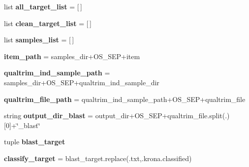 \begin{DoxyCompactItemize}
\item 
list {\bfseries all\+\_\+target\+\_\+list} = \mbox{[}$\,$\mbox{]}\hypertarget{namespaceNGSXclassify_af294c502a5a0fcd149b02d510c337305}{}\label{namespaceNGSXclassify_af294c502a5a0fcd149b02d510c337305}

\item 
list {\bfseries clean\+\_\+target\+\_\+list} = \mbox{[}$\,$\mbox{]}\hypertarget{namespaceNGSXclassify_afb1fd226c54f1212df6365dfa1741d85}{}\label{namespaceNGSXclassify_afb1fd226c54f1212df6365dfa1741d85}

\item 
list {\bfseries samples\+\_\+list} = \mbox{[}$\,$\mbox{]}\hypertarget{namespaceNGSXclassify_a45d4e8028236377e967553e401929a96}{}\label{namespaceNGSXclassify_a45d4e8028236377e967553e401929a96}

\item 
{\bfseries item\+\_\+path} = samples\+\_\+dir+O\+S\+\_\+\+S\+EP+item\hypertarget{namespaceNGSXclassify_a4d87c8a203f9736a3302d6ab28fecd44}{}\label{namespaceNGSXclassify_a4d87c8a203f9736a3302d6ab28fecd44}

\item 
{\bfseries qualtrim\+\_\+ind\+\_\+sample\+\_\+path} = samples\+\_\+dir+O\+S\+\_\+\+S\+EP+qualtrim\+\_\+ind\+\_\+sample\+\_\+dir\hypertarget{namespaceNGSXclassify_a314658da300d776f245e66b1305e3fe1}{}\label{namespaceNGSXclassify_a314658da300d776f245e66b1305e3fe1}

\item 
{\bfseries qualtrim\+\_\+file\+\_\+path} = qualtrim\+\_\+ind\+\_\+sample\+\_\+path+O\+S\+\_\+\+S\+EP+qualtrim\+\_\+file\hypertarget{namespaceNGSXclassify_afc7a77aab3eb745c2ac232544ee16591}{}\label{namespaceNGSXclassify_afc7a77aab3eb745c2ac232544ee16591}

\item 
string {\bfseries output\+\_\+dir\+\_\+blast} = output\+\_\+dir+O\+S\+\_\+\+S\+EP+qualtrim\+\_\+file.\+split(\textquotesingle{}.\textquotesingle{})\mbox{[}0\mbox{]}+\char`\"{}\+\_\+blast\char`\"{}\hypertarget{namespaceNGSXclassify_ae96ee9a5d6d203a0ccbdff8371de8025}{}\label{namespaceNGSXclassify_ae96ee9a5d6d203a0ccbdff8371de8025}

\item 
tuple {\bfseries blast\+\_\+target}
\item 
{\bfseries classify\+\_\+target} = blast\+\_\+target.\+replace(\textquotesingle{}.txt\textquotesingle{},\textquotesingle{}.krona.\+classified\textquotesingle{})\hypertarget{namespaceNGSXclassify_aa44e81f1b4732a8afae3b0cc0d6d107d}{}\label{namespaceNGSXclassify_aa44e81f1b4732a8afae3b0cc0d6d107d}


\end{DoxyCompactItemize}
